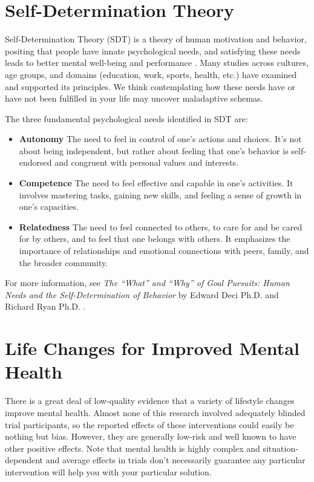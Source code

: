 \documentclass[12pt,letterpaper]{book}
\begin{document}
\chapter{Self-Determination Theory}
\label{sec:sdt}
Self-Determination Theory (SDT) is a theory of human motivation and behavior, positing that people have innate psychological needs, and satisfying these needs leads to better mental well-being and performance \cite{deciSDT}. Many studies across cultures, age groups, and domains (education, work, sports, health, etc.) have examined and supported its principles. We think contemplating how these needs have or have not been fulfilled in your life may uncover maladaptive schemas.

The three fundamental psychological needs identified in SDT are:
\begin{itemize}
    \item \textbf{Autonomy} The need to feel in control of one's actions and choices. It's not about being independent, but rather about feeling that one's behavior is self-endorsed and congruent with personal values and interests.
    \item \textbf{Competence} The need to feel effective and capable in one's activities. It involves mastering tasks, gaining new skills, and feeling a sense of growth in one's capacities.
    \item \textbf{Relatedness} The need to feel connected to others, to care for and be cared for by others, and to feel that one belongs with others. It emphasizes the importance of relationships and emotional connections with peers, family, and the broader community.
\end{itemize}
For more information, see \textit{The “What” and “Why” of Goal Pursuits: Human Needs and the Self-Determination of Behavior} by Edward Deci Ph.D. and Richard Ryan Ph.D. \cite{deciSDT}.
\chapter{Life Changes for Improved Mental Health}
\label{sec:lifechanges}
There is a great deal of low-quality evidence that a variety of lifestyle changes improve mental health. Almost none of this research involved adequately blinded trial participants, so the reported effects of these interventions could easily be nothing but bias. However, they are generally low-risk and well known to have other positive effects. Note that mental health is highly complex and situation-dependent and average effects in trials don't necessarily guarantee any particular intervention will help you with your particular solution.
\end{document}
